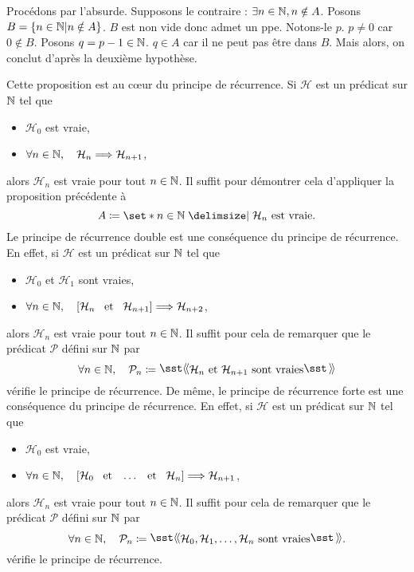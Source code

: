 \documentclass{magnolia}
\begin{document}
\begin{preuve}
Procédons par l'absurde. Supposons le contraire : $\exists n\in \mathbb{N}, n\notin A$.
Posons $B=\left\{n\in \mathbb{N} | n\notin A\right\}$. $B$ est non vide donc admet un ppe. Notons-le $p$. $p\neq 0$ car $0\notin B$. Posons $q=p-1 \in \mathbb{N}$. $q\in A$ car il ne peut pas être dans $B$. Mais alors, on conclut d'après la deuxième hypothèse.

\end{preuve}

\begin{remarques}
\remarque Cette proposition est au cœur du principe de récurrence. Si $\mathcal{H}$ est un prédicat sur $\mathbb{N}$ tel que
\begin{itemize}
\item $\mathcal{H}_0$ est vraie,
\item $\forall n\in\mathbb{N},\quad \mathcal{H}_n \Longrightarrow \mathcal{H}_{n+1}$,
\end{itemize}
alors $\mathcal{H}_n$ est vraie pour tout $n\in\mathbb{N}$. Il suffit pour démontrer cela d'appliquer la proposition précédente à \[A\defeq\enstq{n\in\N}{\text{$\mathcal{H}_n$ est vraie}}.\]
\remarque Le principe de récurrence double est une conséquence du principe de récurrence. En effet, si $\mathcal{H}$ est un prédicat sur $\mathbb{N}$ tel que
\begin{itemize}
\item $\mathcal{H}_0$ et $\mathcal{H}_1$ sont vraies,
\item $\forall n\in\mathbb{N},\quad \left[\mathcal{H}_n \quad\!\text{et}\quad\! \mathcal{H}_{n+1}\right]\Longrightarrow \mathcal{H}_{n+2}$,
\end{itemize}
alors $\mathcal{H}_n$ est vraie pour tout $n\in\mathbb{N}$. Il suffit pour cela de remarquer que le prédicat $\mathcal{P}$ défini sur $\mathbb{N}$ par \[\forall n\in\N\qsep \mathcal{P}_n\defeq\text{\og} \mathcal{H}_n\text{ et }\mathcal{H}_{n+1}\text{ sont vraies} \text{\fg}\]
vérifie le principe de récurrence.
\remarque De même, le principe de récurrence forte est une conséquence du principe de récurrence.
  En effet, si $\mathcal{H}$ est un prédicat sur $\mathbb{N}$ tel que
\begin{itemize}
\item $\mathcal{H}_0$ est vraie,
\item $\forall n\in\mathbb{N},\quad \left[\mathcal{H}_0 \quad\!\text{et}\quad\!\ldots\quad\!\text{et}\quad\! \mathcal{H}_n\right]\Longrightarrow \mathcal{H}_{n+1}$,
\end{itemize}
  alors $\mathcal{H}_n$ est vraie pour tout $n\in\mathbb{N}$. Il suffit pour cela de remarquer que le prédicat $\mathcal{P}$ défini sur $\mathbb{N}$ par 
\[\forall n\in\N\qsep \mathcal{P}_n\defeq\text{\og} \mathcal{H}_0, \mathcal{H}_1, \ldots, \mathcal{H}_{n}\text{ sont vraies} \text{\fg}.\]
vérifie le principe de récurrence.
\end{remarques}
\end{document}
